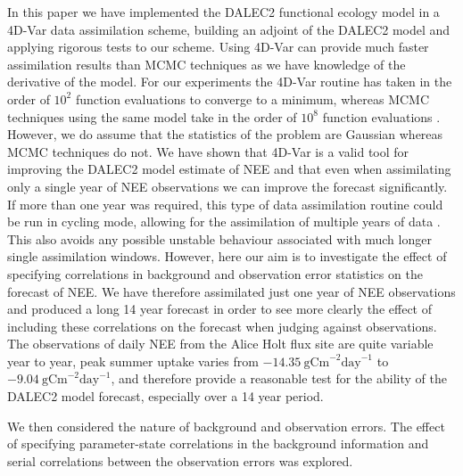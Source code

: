 \documentclass[review]{elsarticle}
\begin{document}
In this paper we have implemented the DALEC2 functional ecology model in a 4D-Var data assimilation scheme, building an adjoint of the DALEC2 model and applying rigorous tests to our scheme. Using 4D-Var can provide much faster assimilation results than MCMC techniques as we have knowledge of the derivative of the model. For our experiments the 4D-Var routine has taken in the order of $10^{2}$ function evaluations to converge to a minimum, whereas MCMC techniques using the same model take in the order of $10^{8}$ function evaluations \citep{Bloom2015}. However, we do assume that the statistics of the problem are Gaussian whereas MCMC techniques do not. We have shown that 4D-Var is a valid tool for improving the DALEC2 model estimate of NEE and that even when assimilating only a single year of NEE observations we can improve the forecast significantly. If more than one year was required, this type of data assimilation routine could be run in cycling mode, allowing for the assimilation of multiple years of data \citep{moodycycled4dvar}. This also avoids any possible unstable behaviour associated with much longer single assimilation windows. However, here our aim is to investigate the effect of specifying correlations in background and observation error statistics on the forecast of NEE. We have therefore assimilated just one year of NEE observations and produced a long 14 year forecast in order to see more clearly the effect of including these correlations on the forecast when judging against observations. The observations of daily NEE from the Alice Holt flux site are quite variable year to year, peak summer uptake varies from $-14.35~\text{gCm}^{-2}\text{day}^{-1}$ to $-9.04~\text{gCm}^{-2}\text{day}^{-1}$, and therefore provide a reasonable test for the ability of the DALEC2 model forecast, especially over a 14 year period.  

We then considered the nature of background and observation errors. The effect of specifying parameter-state correlations in the background information and serial correlations between the observation errors was explored.
\end{document}
